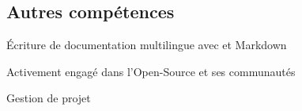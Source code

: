 \documentclass[
  french,
  a4paper
]{resume-openfont}
\begin{document}
\begin{minipage}[t]{0.31\textwidth}
\subsection{Autres compétences}
\vspace{2pt}
\vspace{\topsep} %
\begin{tightemize}
  \item Écriture de documentation multilingue avec  et Markdown
  \item Activement engagé dans l'Open-Source et ses communautés
  \item Gestion de projet
\end{tightemize}


%
%
\end{minipage}%
\hfill%
\end{document}
